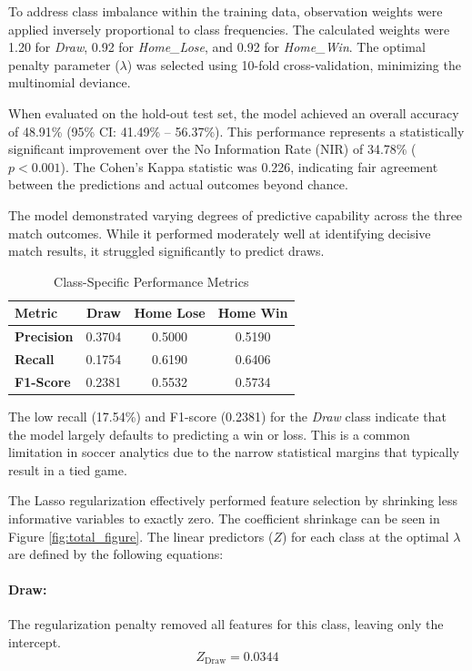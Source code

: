 \documentclass[11pt]{article}
\begin{document}
To address class imbalance within the training data, observation weights were applied inversely proportional to class frequencies. The calculated weights were 1.20 for \textit{Draw}, 0.92 for \textit{Home\_Lose}, and 0.92 for \textit{Home\_Win}. The optimal penalty parameter ($\lambda$) was selected using 10-fold cross-validation, minimizing the multinomial deviance.

When evaluated on the hold-out test set, the model achieved an overall accuracy of 48.91\% (95\% CI: 41.49\% -- 56.37\%). This performance represents a statistically significant improvement over the No Information Rate (NIR) of 34.78\% ($p < 0.001$). The Cohen's Kappa statistic was 0.226, indicating fair agreement between the predictions and actual outcomes beyond chance.

The model demonstrated varying degrees of predictive capability across the three match outcomes. While it performed moderately well at identifying decisive match results, it struggled significantly to predict draws. 

\begin{table}[h!]
\centering
\begin{tabular}{lccc}
\hline
\textbf{Metric} & \textbf{Draw} & \textbf{Home Lose} & \textbf{Home Win} \\
\hline
\textbf{Precision} & 0.3704 & 0.5000 & 0.5190 \\
\textbf{Recall}    & 0.1754 & 0.6190 & 0.6406 \\
\textbf{F1-Score}  & 0.2381 & 0.5532 & 0.5734 \\
\hline
\end{tabular}
\caption{Class-Specific Performance Metrics}
\label{tab:class_metrics}
\end{table}

The low recall (17.54\%) and F1-score (0.2381) for the \textit{Draw} class indicate that the model largely defaults to predicting a win or loss. This is a common limitation in soccer analytics due to the narrow statistical margins that typically result in a tied game.

The Lasso regularization effectively performed feature selection by shrinking less informative variables to exactly zero. The coefficient shrinkage can be seen in Figure \ref{fig:total_figure}. The linear predictors ($Z$) for each class at the optimal $\lambda$ are defined by the following equations:

\paragraph{Draw:}
The regularization penalty removed all features for this class, leaving only the intercept.
\[
Z_{\text{Draw}} = 0.0344
\]
\end{document}
